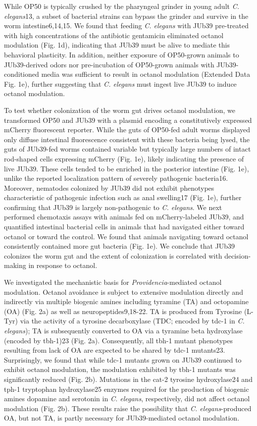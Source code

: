 \documentclass[]{article}
\begin{document}
While OP50 is typically crushed by the pharyngeal grinder in young adult
\textit{C. elegans}13, a subset of bacterial strains can bypass the
grinder and survive in the worm intestine6,14,15. We found that feeding
\textit{C. elegans} with JUb39 pre-treated with high concentrations of
the antibiotic gentamicin eliminated octanol modulation (Fig. 1d),
indicating that JUb39 must be alive to mediate this behavioral
plasticity. In addition, neither exposure of OP50-grown animals to
JUb39-derived odors nor pre-incubation of OP50-grown animals with
JUb39-conditioned media was sufficient to result in octanol modulation
(Extended Data Fig. 1e), further suggesting that \textit{C. elegans}
must ingest live JUb39 to induce octanol modulation.

To test whether colonization of the worm gut drives octanol modulation,
we transformed OP50 and JUb39 with a plasmid encoding a constitutively
expressed mCherry fluorescent reporter. While the guts of OP50-fed adult
worms displayed only diffuse intestinal fluorescence consistent with
these bacteria being lysed, the guts of JUb39-fed worms contained
variable but typically large numbers of intact rod-shaped cells
expressing mCherry (Fig. 1e), likely indicating the presence of live
JUb39. These cells tended to be enriched in the posterior intestine
(Fig. 1e), unlike the reported localization pattern of severely
pathogenic bacteria16. Moreover, nematodes colonized by JUb39 did not
exhibit phenotypes characteristic of pathogenic infection such as anal
swelling17 (Fig. 1e), further confirming that JUb39 is largely
non-pathogenic to \textit{C. elegans}. We next performed chemotaxis
assays with animals fed on mCherry-labeled JUb39, and quantified
intestinal bacterial cells in animals that had navigated either toward
octanol or toward the control. We found that animals navigating toward
octanol consistently contained more gut bacteria (Fig. 1e). We conclude
that JUb39 colonizes the worm gut and the extent of colonization is
correlated with decision-making in response to octanol.

We investigated the mechanistic basis for \textit{Providencia}-mediated
octanol modulation. Octanol avoidance is subject to extensive modulation
directly and indirectly via multiple biogenic amines including tyramine
(TA) and octopamine (OA) (Fig. 2a) as well as neuropeptides9,18-22. TA
is produced from Tyrosine (L-Tyr) via the activity of a tyrosine
decarboxylase (TDC; encoded by tdc-1 in \textit{C. elegans}); TA is
subsequently converted to OA via a tyramine beta hydroxylase (encoded by
tbh-1)23 (Fig. 2a). Consequently, all tbh-1 mutant phenotypes resulting
from lack of OA are expected to be shared by tdc-1 mutants23.
Surprisingly, we found that while tdc-1 mutants grown on JUb39 continued
to exhibit octanol modulation, the modulation exhibited by tbh-1 mutants
was significantly reduced (Fig. 2b). Mutations in the cat-2 tyrosine
hydroxylase24 and tph-1 tryptophan hydroxylase25 enzymes required for
the production of biogenic amines dopamine and serotonin in
\textit{C. elegans}, respectively, did not affect octanol modulation
(Fig. 2b). These results raise the possibility that
\textit{C. elegans}-produced OA, but not TA, is partly necessary for
JUb39-mediated octanol modulation.
\end{document}
